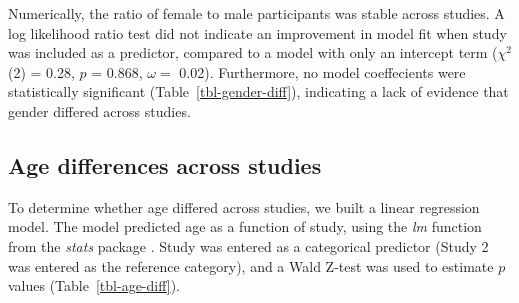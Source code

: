 \documentclass[
  letterpaper,
  DIV=11,
  numbers=noendperiod]{scrartcl}
\begin{document}
Numerically, the ratio of female to male participants was stable across
studies. A log likelihood ratio test did not indicate an improvement in
model fit when study was included as a predictor, compared to a model
with only an intercept term (\(\chi^{2}\) (2) = 0.28, \(p\) = 0.868,
\(\omega =\) 0.02). Furthermore, no model coeffecients were
statistically significant (Table~\ref{tbl-gender-diff}), indicating a
lack of evidence that gender differed across studies.

\subsection{Age differences across
studies}\label{age-differences-across-studies}

\begin{table}

\caption{\label{tbl-age-diff}Linear regression models predicting
participant age (years) as a function of study.}


\end{table}%

To determine whether age differed across studies, we built a linear
regression model. The model predicted age as a function of study, using
the \emph{lm} function from the \emph{stats} package
\citep{rcoreteam_2023}. Study was entered as a categorical predictor
(Study 2 was entered as the reference category), and a Wald Z-test was
used to estimate \(p\) values (Table~\ref{tbl-age-diff}).
\end{document}
